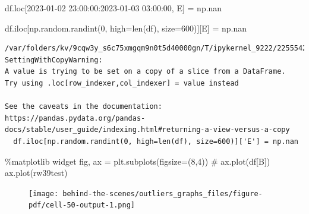 \documentclass[
  letterpaper,
  DIV=11,
  numbers=noendperiod,
  oneside]{scrreprt}
\newenvironment{Shaded}{\begin{snugshade}}{\end{snugshade}}
\newcommand{\BuiltInTok}[1]{\textcolor[rgb]{0.00,0.23,0.31}{#1}}
\newcommand{\CommentTok}[1]{\textcolor[rgb]{0.37,0.37,0.37}{#1}}
\newcommand{\DecValTok}[1]{\textcolor[rgb]{0.68,0.00,0.00}{#1}}
\newcommand{\NormalTok}[1]{\textcolor[rgb]{0.00,0.23,0.31}{#1}}
\newcommand{\OperatorTok}[1]{\textcolor[rgb]{0.37,0.37,0.37}{#1}}
\newcommand{\StringTok}[1]{\textcolor[rgb]{0.13,0.47,0.30}{#1}}
\begin{document}
\begin{Shaded}
\begin{Highlighting}[]
\NormalTok{df.loc[}\StringTok{\textquotesingle{}2023{-}01{-}02 23:00:00\textquotesingle{}}\NormalTok{:}\StringTok{\textquotesingle{}2023{-}01{-}03 03:00:00\textquotesingle{}}\NormalTok{, }\StringTok{\textquotesingle{}E\textquotesingle{}}\NormalTok{] }\OperatorTok{=}\NormalTok{ np.nan}
\end{Highlighting}
\end{Shaded}

\begin{Shaded}
\begin{Highlighting}[]
\NormalTok{df.iloc[np.random.randint(}\DecValTok{0}\NormalTok{, high}\OperatorTok{=}\BuiltInTok{len}\NormalTok{(df), size}\OperatorTok{=}\DecValTok{600}\NormalTok{)][}\StringTok{\textquotesingle{}E\textquotesingle{}}\NormalTok{] }\OperatorTok{=}\NormalTok{ np.nan}
\end{Highlighting}
\end{Shaded}

\begin{verbatim}
/var/folders/kv/9cqw3y_s6c75xmgqm9n0t5d40000gn/T/ipykernel_9222/2255542716.py:1: SettingWithCopyWarning: 
A value is trying to be set on a copy of a slice from a DataFrame.
Try using .loc[row_indexer,col_indexer] = value instead

See the caveats in the documentation: https://pandas.pydata.org/pandas-docs/stable/user_guide/indexing.html#returning-a-view-versus-a-copy
  df.iloc[np.random.randint(0, high=len(df), size=600)]['E'] = np.nan
\end{verbatim}

\begin{Shaded}
\begin{Highlighting}[]
\OperatorTok{\%}\NormalTok{matplotlib widget}
\NormalTok{fig, ax }\OperatorTok{=}\NormalTok{ plt.subplots(figsize}\OperatorTok{=}\NormalTok{(}\DecValTok{8}\NormalTok{,}\DecValTok{4}\NormalTok{))}
\CommentTok{\# ax.plot(df[\textquotesingle{}B\textquotesingle{}])}
\NormalTok{ax.plot(rw39test)}
\end{Highlighting}
\end{Shaded}

\begin{figure}[H]

{\centering \texttt{[image: behind-the-scenes/outliers\_graphs\_files/figure-pdf/cell-50-output-1.png]}

}

\end{figure}
\end{document}
